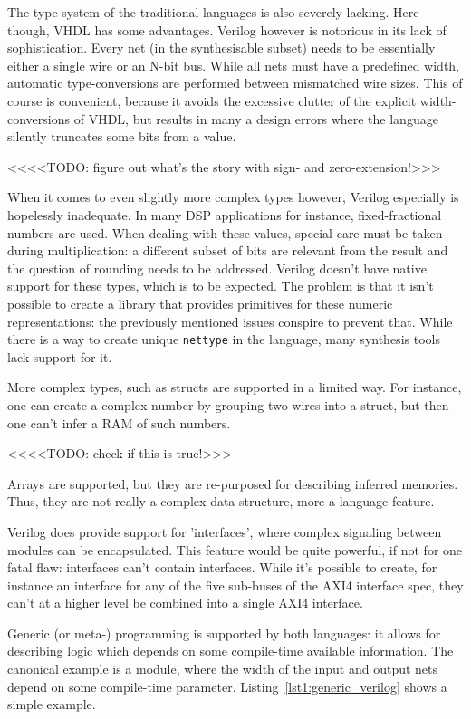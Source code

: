 \documentclass[conference,compsoc]{IEEEtran}
\begin{document}
The type-system of the traditional languages is also severely lacking. Here though, VHDL has some
advantages. Verilog however is notorious in its lack of sophistication. Every net (in the
synthesisable subset) needs to be essentially either a single wire or an N-bit bus. While all nets
must have a predefined width, automatic type-conversions are performed between mismatched wire sizes.
This of course is convenient, because it avoids the excessive clutter of the explicit
width-conversions of VHDL, but results in many a design errors where the language
silently truncates some bits from a value.

<<<<TODO: figure out what's the story with sign- and zero-extension!>>>

When it comes to even slightly more complex types however, Verilog especially is hopelessly
inadequate. In many DSP applications for instance, fixed-fractional numbers are used. When dealing
with these values, special care must be taken during multiplication: a different subset of bits
are relevant from the result and the question of rounding needs to be addressed. Verilog doesn't
have native support for these types, which is to be expected. The problem is that it
isn't possible to create a library that provides primitives for these numeric representations:
the previously mentioned issues conspire to prevent that. While there is a way to create
unique {\tt nettype} in the language, many synthesis tools lack support for it.

More complex types, such as structs are supported in a limited way. For instance, one can create
a complex number by grouping two wires into a struct, but then one can't infer a RAM of such numbers.

<<<<TODO: check if this is true!>>>

Arrays are supported, but they are re-purposed for describing inferred memories. Thus, they are
not really a complex data structure, more a language feature.

Verilog does provide support for 'interfaces', where complex signaling between modules can be
encapsulated. This feature would be quite powerful, if not for one fatal flaw: interfaces can't
contain interfaces. While it's possible to create, for instance an interface for any of the five
sub-buses of the AXI4 interface spec, they can't at a higher level be combined into a single
AXI4 interface.

Generic (or meta-) programming is supported by both languages: it allows for describing logic
which depends on some compile-time available information. The canonical example is a module,
where the width of the input and output nets depend on some compile-time parameter.
Listing~\ref{lst1:generic_verilog} shows a simple example.
\end{document}
